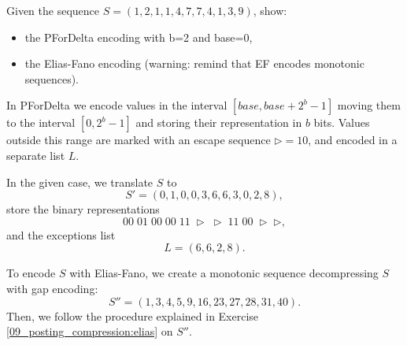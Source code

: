 \exercise

Given the sequence $S = (1, 2, 1, 1, 4, 7, 7, 4, 1, 3, 9)$, show:
%
\begin{itemize}
  \item the PForDelta encoding with b=2 and base=0,
  \item the Elias-Fano encoding (warning: remind that EF encodes monotonic
    sequences).
\end{itemize}

\solution

In PForDelta we encode values in the interval $[base,base+2^b-1]$ moving
them to the interval $[0, 2^b-1]$ and storing their representation in $b$ bits.
Values outside this range are marked with an escape sequence
$\triangleright=10$, and encoded in a separate list $L$.

In the given case, we translate $S$ to
%
$$S'=(0,1,0,0,3,6,6,3,0,2,8),$$
%
store the binary representations
%
$$00\;01\;00\;00\;11\;\triangleright\;\triangleright\;11\;00\;\triangleright\;
\triangleright,$$
%
and the exceptions list
$$L=(6,6,2,8).$$

To encode $S$ with Elias-Fano, we create a monotonic sequence decompressing $S$
with gap encoding:
%
$$S''=(1,3,4,5,9,16,23,27,28,31,40).$$
%
Then, we follow the procedure explained in Exercise 
\ref{09_posting_compression:elias} on $S''$.